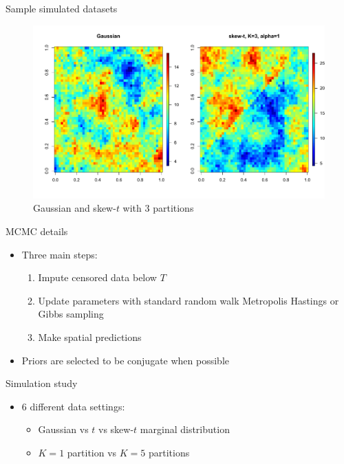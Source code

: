 \documentclass{beamer}
\begin{document}
\begin{frame}{Sample simulated datasets}
  \centering
  \begin{figure}
  \includegraphics[width=1\linewidth]{./plots/pot/gauss-vs-skew-t3.pdf}
  \caption{Gaussian and skew-$t$ with 3 partitions}
  \end{figure}
\end{frame}

\begin{frame}{MCMC details}
  \begin{itemize} \setlength{\itemsep}{0.5em}
    \item Three main steps:
    \begin{enumerate}[1.]
      \item Impute censored data below $T$
      \item Update parameters with standard random walk Metropolis Hastings or Gibbs sampling
      \item Make spatial predictions
    \end{enumerate}
    \item Priors are selected to be conjugate when possible
  \end{itemize}
\end{frame}

\begin{frame}{Simulation study}
  \begin{itemize} \setlength{\itemsep}{0.5em}
    \item 6 different data settings:
    \begin{itemize}
      \item Gaussian vs $t$ vs skew-$t$ marginal distribution
        \item $K=1$ partition vs $K=5$ partitions
    \end{itemize}
  \end{itemize}
\end{frame}
\end{document}

